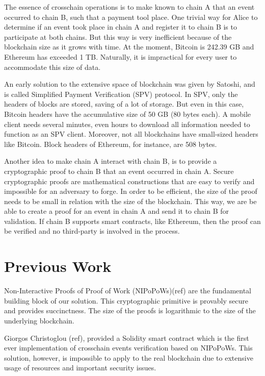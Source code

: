 The essence of crosschain operations is to make known to chain A that an event
occurred to chain B, such that a payment tool place. One trivial way for Alice
to determine if an event took place in chain A and register it to chain B is to
participate at both chains. But this way is very inefficient because of the
blockchain size as it grows with time. At the moment, Bitcoin is 242.39 GB and
Ethereum has exceeded 1 TB. Naturally, it is impractical for every user to
accommodate this size of data.

An early solution to the extensive space of blockchain was given by Satoshi,
and is called Simplified Payment Verification (SPV) protocol. In SPV, only the
headers of blocks are stored, saving of a lot of storage. But even in this
case, Bitcoin headers have the accumulative size of 50 GB (80 bytes each).  A
mobile client needs several minutes, even hours to download all information
needed to function as an SPV client. Moreover, not all blockchains have
small-sized headers like Bitcoin. Block headers of Ethereum, for instance, are
508 bytes.

Another idea to make chain A interact with chain B, is to provide a
cryptographic proof to chain B that an event occurred in chain A. Secure
cryptographic proofs are mathematical constructions that are easy to verify and
impossible for an adversary to forge. In order to be efficient, the size of the
proof needs to be small in relation with the size of the blockchain. This way,
we are be able to create a proof for an event in chain A and send it to chain B
for validation. If chain B supports smart contracts, like Ethereum, then the
proof can be verified and no third-party is involved in the process.

\section{Previous Work}

Non-Interactive Proofs of Proof of Work (NIPoPoWs)(ref) are the fundamental
building block of our solution. This cryptographic primitive is provably secure
and provides succinctness. The size of the proofs is logarithmic to the size of
the underlying blockchain.

Giorgos Christoglou (ref), provided a Solidity smart contract which is the
first ever implementation of crosschain events verification based on NIPoPoWs.
This solution, however, is impossible to apply to the real blockchain due to
extensive usage of resources and important security issues.

